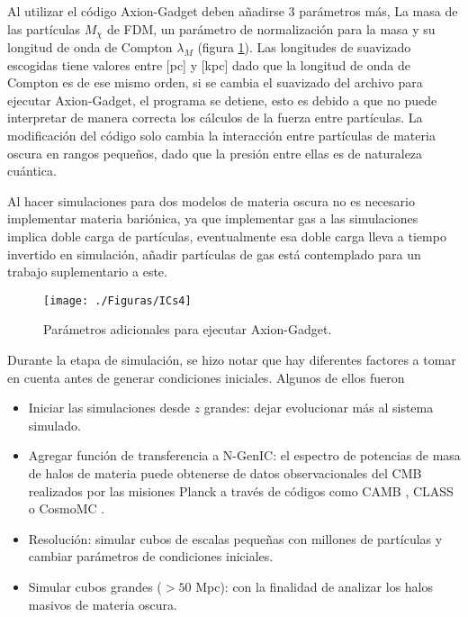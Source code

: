 \documentclass[a4paper,openright,10pt, oneside, final]{book}
\begin{document}
Al utilizar el código Axion-Gadget deben añadirse 3 parámetros más, La masa de las partículas $M_{\chi}$ de FDM, un parámetro de normalización para la masa y su longitud de onda de Compton $\lambda_{M}$ (figura \ref{fig 4.2}). Las longitudes de suavizado escogidas tiene valores entre [pc] y [kpc] dado que la longitud de onda de Compton es de ese mismo orden, si se cambia el suavizado del archivo para ejecutar Axion-Gadget, el programa se detiene, esto es debido a que no puede interpretar de manera correcta los cálculos de la fuerza entre partículas. La modificación del código solo cambia la interacción entre partículas de materia oscura en rangos pequeños, dado que la presión entre ellas es de naturaleza cuántica.

Al hacer simulaciones para dos modelos de materia oscura no es necesario implementar materia bariónica, ya que implementar gas a las simulaciones implica doble carga de partículas, eventualmente esa doble carga lleva a tiempo invertido en simulación, añadir partículas de gas está contemplado para un trabajo suplementario a este.

\begin{figure}
\centering \texttt{[image: ./Figuras/ICs4]}
\caption{\footnotesize{Parámetros adicionales para ejecutar Axion-Gadget.}}
\label{fig 4.2}
\end{figure}




Durante la etapa de simulación, se hizo notar que hay diferentes factores a tomar en cuenta antes de generar condiciones iniciales. Algunos de ellos fueron
\begin{itemize}
\item Iniciar las simulaciones desde $z$ grandes: dejar evolucionar más al sistema simulado.
\item Agregar función de transferencia a N-GenIC: el espectro de potencias de masa de halos de materia puede obtenerse de datos observacionales del CMB realizados por las misiones Planck a través de códigos como CAMB \cite{4.3.1}, CLASS \cite{4.3.1.2} o CosmoMC \cite{4.3.2}.
\item Resolución: simular cubos de escalas pequeñas con millones de partículas y cambiar parámetros de condiciones iniciales.
\item Simular cubos grandes ($> 50 $ Mpc): con la finalidad de analizar los halos masivos de materia oscura.
\end{itemize}
\end{document}
